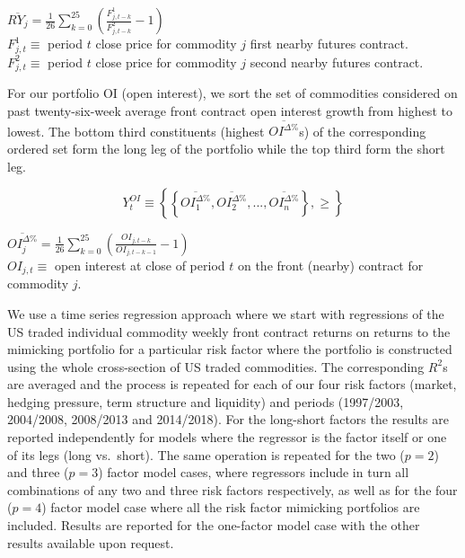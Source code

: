 \documentclass[]{elsarticle} %
\begin{document}
\(\overline{RY_{j}}=\frac{1}{26}\sum_{k=0}^{25}(\frac{F_{j,t-k}^{1}}{F_{j,t-k}^{2}} - 1)\)\\
\(F_{j,t}^{1}\equiv\) period \(t\) close price for commodity \(j\) first nearby futures contract.\\
\(F_{j,t}^{2}\equiv\) period \(t\) close price for commodity \(j\) second nearby futures contract.

\medskip\setlength{\parindent}{0pt}

For our portfolio OI (open interest), we sort the set of commodities considered on past twenty-six-week average front contract open interest growth from highest to lowest. The bottom third constituents (highest \(\overline{OI^{\Delta \%}}\)s) of the corresponding ordered set form the long leg of the portfolio while the top third form the short leg.

\[Y_{t}^{OI}\equiv\left \{ \left \{ \overline{{OI}_{1}^{\Delta \%}}, \overline{{OI}_{2}^{\Delta \%}}, ..., \overline{{OI}_{n}^{\Delta \%}} \right \}, \geq \right \}\]

\(\overline{{OI}_{j}^{\Delta \%}}=\frac{1}{26}\sum_{k=0}^{25}(\frac{{OI}_{j,t-k}}{{OI}_{j,t-k-1}} - 1)\)\\
\(OI_{j,t}\equiv\) open interest at close of period \(t\) on the front (nearby) contract for commodity \(j\).

\medskip\setlength{\parindent}{0pt}

We use a time series regression approach where we start with regressions of the US traded individual commodity weekly front contract returns on returns to the mimicking portfolio for a particular risk factor where the portfolio is constructed using the whole cross-section of US traded commodities. The corresponding \(R^{2}\)s are averaged and the process is repeated for each of our four risk factors (market, hedging pressure, term structure and liquidity) and periods (1997/2003, 2004/2008, 2008/2013 and 2014/2018). For the long-short factors the results are reported independently for models where the regressor is the factor itself or one of its legs (long vs.~short). The same operation is repeated for the two (\(p=2\)) and three (\(p=3\)) factor model cases, where regressors include in turn all combinations of any two and three risk factors respectively, as well as for the four (\(p=4\)) factor model case where all the risk factor mimicking portfolios are included. Results are reported for the one-factor model case with the other results available upon request.

\medskip\setlength{\parindent}{0pt}
\end{document}
